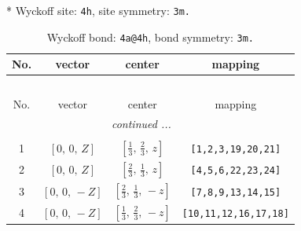 \documentclass[fleqn,8pt]{jsarticle}
\begin{document}
* Wyckoff site: {\tt 4h}, site symmetry: {\tt 3m.}
\renewcommand{\arraystretch}{1.2}
\begin{longtable}{cccc}
\caption{Wyckoff bond: {\tt 4a@4h}, bond symmetry: {\tt 3m.}}
 \\
 \hline \hline
No. & vector & center & mapping \\ \hline \endfirsthead

\multicolumn{3}{l}{\tablename\ \thetable{}} \\
 \hline \hline
No. & vector & center & mapping \\ \hline \endhead

 \hline \hline
\multicolumn{3}{r}{\footnotesize\it continued ...} \\ \endfoot

 \hline \hline
\multicolumn{3}{r}{} \\ \endlastfoot

1 & $\left[ 0,\, 0,\, Z \right]$ & $\left[ \frac{1}{3},\, \frac{2}{3},\, z \right]$ & {\tt [1,2,3,19,20,21]} \\ \hline
2 & $\left[ 0,\, 0,\, Z \right]$ & $\left[ \frac{2}{3},\, \frac{1}{3},\, z \right]$ & {\tt [4,5,6,22,23,24]} \\ \hline
3 & $\left[ 0,\, 0,\, - Z \right]$ & $\left[ \frac{2}{3},\, \frac{1}{3},\, - z \right]$ & {\tt [7,8,9,13,14,15]} \\ \hline
4 & $\left[ 0,\, 0,\, - Z \right]$ & $\left[ \frac{1}{3},\, \frac{2}{3},\, - z \right]$ & {\tt [10,11,12,16,17,18]} \\
\end{longtable}
\renewcommand{\arraystretch}{1.2}
\end{document}
